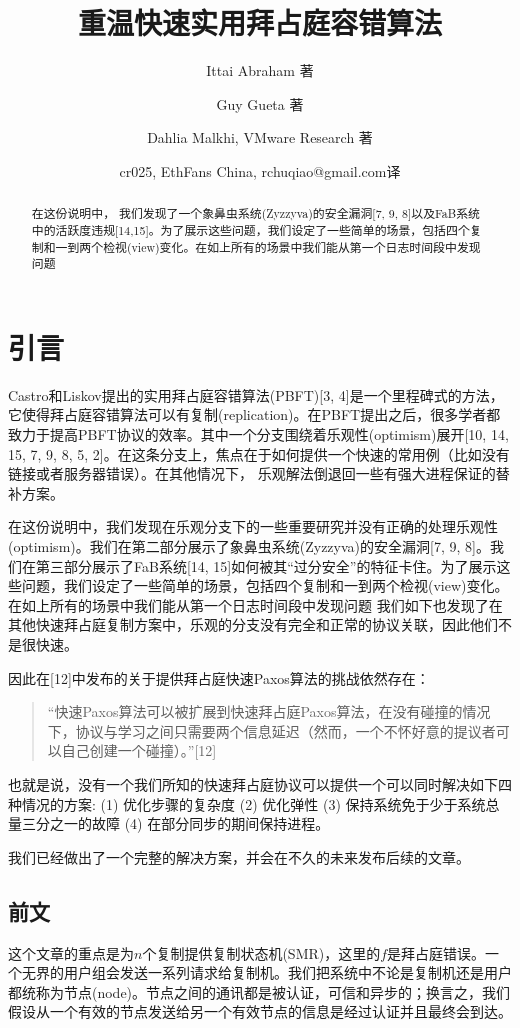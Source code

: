 \documentclass[UTF8]{ctexart}
\title{重温快速实用拜占庭容错算法}
\author{Ittai Abraham 著 \and Guy Gueta 著 \and Dahlia Malkhi, VMware Research 著 \and cr025, EthFans China, rchuqiao@gmail.com译}
\begin{document}
\maketitle

\begin{abstract}
在这份说明中， 我们发现了一个象鼻虫系统(Zyzzyva)的安全漏洞[7, 9, 8]以及FaB系统中的活跃度违规[14,15]。为了展示这些问题，我们设定了一些简单的场景，包括四个复制和一到两个检视(view)变化。在如上所有的场景中我们能从第一个日志时间段中发现问题
\end{abstract}

\section{引言}
Castro和Liskov提出的实用拜占庭容错算法(PBFT)[3, 4]是一个里程碑式的方法，它使得拜占庭容错算法可以有复制(replication)。在PBFT提出之后，很多学者都致力于提高PBFT协议的效率。其中一个分支围绕着乐观性(optimism)展开[10, 14, 15, 7, 9, 8, 5, 2]。在这条分支上，焦点在于如何提供一个快速的常用例（比如没有链接或者服务器错误）。在其他情况下， 乐观解法倒退回一些有强大进程保证的替补方案。

在这份说明中，我们发现在乐观分支下的一些重要研究并没有正确的处理乐观性(optimism)。我们在第二部分展示了象鼻虫系统(Zyzzyva)的安全漏洞[7, 9, 8]。我们在第三部分展示了FaB系统[14, 15]如何被其“过分安全”的特征卡住。为了展示这些问题，我们设定了一些简单的场景，包括四个复制和一到两个检视(view)变化。在如上所有的场景中我们能从第一个日志时间段中发现问题
我们如下也发现了在其他快速拜占庭复制方案中，乐观的分支没有完全和正常的协议关联，因此他们不是很快速。

因此在[12]中发布的关于提供拜占庭快速Paxos算法的挑战依然存在：
\begin{quotation}
“快速Paxos算法可以被扩展到快速拜占庭Paxos算法，在没有碰撞的情况下，协议与学习之间只需要两个信息延迟（然而，一个不怀好意的提议者可以自己创建一个碰撞）。”[12]
\end{quotation}

也就是说，没有一个我们所知的快速拜占庭协议可以提供一个可以同时解决如下四种情况的方案: (1) 优化步骤的复杂度 (2) 优化弹性 (3) 保持系统免于少于系统总量三分之一的故障 (4) 在部分同步的期间保持进程。

我们已经做出了一个完整的解决方案，并会在不久的未来发布后续的文章。


\subsection*{前文} \label{sec:firstpage}
这个文章的重点是为$n$个复制提供复制状态机(SMR)，这里的$f$是拜占庭错误。一个无界的用户组会发送一系列请求给复制机。我们把系统中不论是复制机还是用户都统称为节点(node)。节点之间的通讯都是被认证，可信和异步的；换言之，我们假设从一个有效的节点发送给另一个有效节点的信息是经过认证并且最终会到达。
\end{document}
